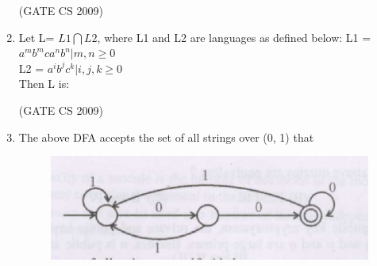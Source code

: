 \documentclass[a4paper, 11pt]{article}
\begin{document}
\begin{enumerate}
    \hfill (GATE CS 2009)

    \item  Let L= $L1\bigcap L2$, where L1 and L2 are languages as defined below:
    L1 = {$a^m b^m c a^n b^n | m,n \geq0$}\\
    L2 = {$a^i b^j c^k| i,j,k \geq0$}\\
    Then L is:\\

    \begin{enumerate}
    \end{enumerate}

    \hfill (GATE CS 2009)
    
    \item The above DFA accepts the set of all strings over (0, 1) that
    \begin{figure}[H]
        \centering
        \includegraphics[width=\columnwidth]{figs/q41.png}
        \caption{}
        \label{fig:placeholder}
    \end{figure}
        
    
    \begin{enumerate}
    \end{enumerate}


\end{enumerate}
\end{document}
